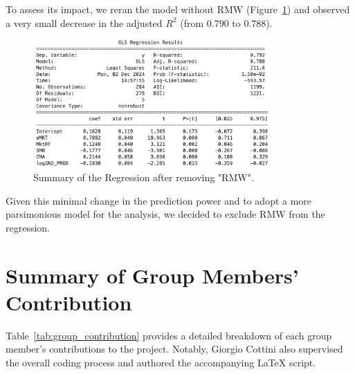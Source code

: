 \documentclass[12pt, openright, oneside]{report}
\begin{document}
To assess its impact, we reran the model without RMW (Figure~\ref{fig:RMW5}) and observed a very small decrease in the 
adjusted $R^2$ (from 0.790 to 0.788).

\begin{figure}[h!]
    \centering
    \includegraphics[width=0.8\textwidth]{images/RMW5.png}
    \caption{Summary of the Regression after removing "RMW".}\label{fig:RMW5}
\end{figure}


Given this minimal change in the prediction power and to adopt a more parsimonious model for the analysis, we decided to
exclude RMW from the regression.


\section*{Summary of Group Members' Contribution}

Table~\ref{tab:group_contribution} provides a detailed breakdown of each group member's contributions to the project. 
Notably, Giorgio Cottini also supervised the overall coding process and authored the accompanying LaTeX script.\\
\end{document}
